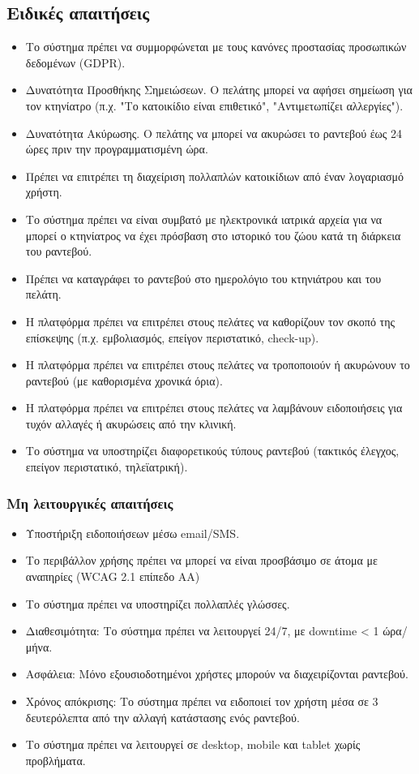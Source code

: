 \documentclass[12pt,a4paper,twoside]{book}
\begin{document}
\subsection{Ειδικές απαιτήσεις} %
\begin{itemize}
  \item Το σύστημα πρέπει να συμμορφώνεται με τους κανόνες προστασίας προσωπικών δεδομένων (GDPR). %
  \item Δυνατότητα Προσθήκης Σημειώσεων. Ο πελάτης μπορεί να αφήσει σημείωση για τον κτηνίατρο (π.χ. "Το κατοικίδιο είναι επιθετικό", "Αντιμετωπίζει αλλεργίες"). %
  \item Δυνατότητα Ακύρωσης. Ο πελάτης  να μπορεί να ακυρώσει το ραντεβού έως 24 ώρες πριν την προγραμματισμένη ώρα.%
  \item Πρέπει να επιτρέπει τη διαχείριση πολλαπλών κατοικίδιων από έναν λογαριασμό χρήστη. %
  \item Το σύστημα πρέπει να είναι συμβατό με ηλεκτρονικά ιατρικά αρχεία για να μπορεί ο κτηνίατρος να έχει πρόσβαση στο ιστορικό του ζώου κατά τη διάρκεια του ραντεβού. %
  \item Πρέπει να καταγράφει το ραντεβού στο ημερολόγιο του κτηνιάτρου και του πελάτη.
  \item Η πλατφόρμα πρέπει να επιτρέπει στους πελάτες να καθορίζουν τον σκοπό της επίσκεψης (π.χ. εμβολιασμός, επείγον περιστατικό, check-up).
  \item Η πλατφόρμα πρέπει να επιτρέπει στους πελάτες να τροποποιούν ή ακυρώνουν το ραντεβού (με καθορισμένα χρονικά όρια).
  \item Η πλατφόρμα πρέπει να επιτρέπει στους πελάτες να λαμβάνουν ειδοποιήσεις για τυχόν αλλαγές ή ακυρώσεις από την κλινική. %
  \item Το σύστημα να υποστηρίζει διαφορετικούς τύπους ραντεβού (τακτικός έλεγχος, επείγον περιστατικό, τηλεϊατρική). %
\end{itemize}

\subsubsection{Μη λειτουργικές απαιτήσεις}
\begin{itemize}
  \item Υποστήριξη ειδοποιήσεων μέσω email/SMS. %
  \item Το περιβάλλον χρήσης πρέπει να μπορεί να  είναι προσβάσιμο σε  άτομα με αναπηρίες (WCAG 2.1 επίπεδο AA) %
  \item Το σύστημα πρέπει να υποστηρίζει πολλαπλές γλώσσες.
  \item Διαθεσιμότητα: Το σύστημα πρέπει να λειτουργεί 24/7, με downtime < 1 ώρα/μήνα.
  \item Ασφάλεια: Μόνο εξουσιοδοτημένοι χρήστες μπορούν να διαχειρίζονται ραντεβού. %
  \item Χρόνος απόκρισης: Το σύστημα πρέπει να ειδοποιεί τον χρήστη μέσα σε 3 δευτερόλεπτα από την αλλαγή κατάστασης ενός ραντεβού. %
  \item Το σύστημα πρέπει να λειτουργεί σε desktop, mobile και tablet χωρίς προβλήματα.
\end{itemize}
\end{document}
